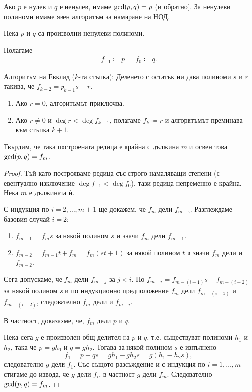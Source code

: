 \documentclass[numbers=endperiod, DIV=15, bibliography=totocnumbered]{scrartcl}
\begin{document}
Ако $p$ е нулев и $q$ е ненулев, имаме $\operatorname{gcd}(p, q) = p$ (и обратно). За ненулеви полиноми имаме явен алгоритъм за намиране на НОД.
\begin{theorem}
  Нека $p$ и $q$ са произволни ненулеви полиноми.

  Полагаме
  \begin{align*}
     f_{-1} \coloneqq p &&
     f_0 \coloneqq q.
  \end{align*}

  Алгоритъм на Евклид ($k$-та стъпка): Деленето с остатък ни дава полиноми $s$ и $r$ такива, че $f_{k-2} = p_{k-1} s + r$.
    \begin{enumerate}
      \item Ако $r = 0$, алгоритъмът приключва.
      \item Ако $r \neq 0$ и $\deg r < \deg f_{k-1}$, полагаме $f_k \coloneqq r$ и алгоритъмът преминава към стъпка $k + 1$.
    \end{enumerate}

  Твърдим, че така построената редица е крайна с дължина $m$ и освен това $\operatorname{gcd}(p, q) = f_m$.
\end{theorem}
\begin{proof}
  Тъй като построяваме редица със строго намаляващи степени (с евентуално изключение $\deg f_{-1} < \deg f_0$), тази редица непременно е крайна. Нека $m$ е дължината ѝ.

  С индукция по $i = 2, \ldots, m + 1$ ще докажем, че $f_m$ дели $f_{m-i}$. Разглеждаме базовия случай $i = 2$:
  \begin{enumerate}
    \item $f_{m-1} = f_m s$ за някой полином $s$ и значи $f_m$ дели $f_{m-1}$.
    \item $f_{m-2} = f_{m-1} t + f_m = f_m (s t + 1)$ за някой полином $t$ и значи $f_m$ дели и $f_{m-2}$.
  \end{enumerate}

  Сега допускаме, че $f_m$ дели $f_{m-j}$ за $j < i$. Но $f_{m-i} = f_{m-(i-1)} s + f_{m-(i-2)}$ за някой полином $s$ и по индукционно предположение $f_m$ дели $f_{m-(i-1)}$ и $f_{m-(i-2)}$, следователно $f_m$ дели и $f_{m-i}$.

  В частност, доказахме, че, $f_m$ дели $p$ и $q$.

  Нека сега $g$ е произволен общ делител на $p$ и $q$, т.е. съществуват полиноми $h_1$ и $h_2$, така че $p = g h_1$ и $q = g h_2$. Тогава за някой полином $s$ е изпълнено
  \begin{displaymath}
    f_1 = p - qs = g h_1 - g h_2 s = g (h_1 - h_2 s),
  \end{displaymath}
  следователно $g$ дели $f_1$. Със същото разсъждение и с индукция по $i = 1, \ldots, m$ стигаме до извода, че $g$ дели $f_i$, в частност $g$ дели $f_m$. Следователно $\operatorname{gcd}(p, q) = f_m$.
\end{proof}
\end{document}
